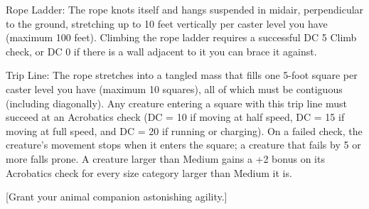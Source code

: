 {Rope Ladder: The rope knots itself and hangs suspended in midair, perpendicular to the ground, stretching up to 10 feet vertically per caster level you have (maximum 100 feet). Climbing the rope ladder requires a successful DC 5 Climb check, or DC 0 if there is a wall adjacent to it you can brace it against.

Trip Line: The rope stretches into a tangled mass that fills one 5-foot square per caster level you have (maximum 10 squares), all of which must be contiguous (including diagonally). Any creature entering a square with this trip line must succeed at an Acrobatics check (DC = 10 if moving at half speed, DC = 15 if moving at full speed, and DC = 20 if running or charging). On a failed check, the creature's movement stops when it enters the square; a creature that fails by 5 or more falls prone. A creature larger than Medium gains a +2 bonus on its Acrobatics check for every size category larger than Medium it is.}
        
[Grant your animal companion astonishing agility.]
        
